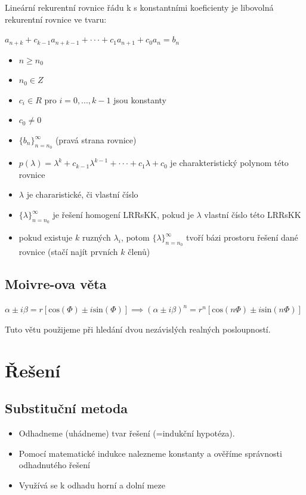 \documentclass{szzclass}
\begin{document}
Lineární rekurentní rovnice řádu k s konstantními koeficienty je
libovolná rekurentní rovnice ve tvaru:

\begin{center}
$a_{n+k} + c_{k−1}a_{n+k−1} + · · · + c_1a_{n+1} + c_0a_n = b_n$
\end{center}

\begin{itemize}
    \item $n \geq n_0$
    \item $n_0 \in Z$
    \item $c_i \in R$ pro $i = 0, . . . , k − 1$ jsou konstanty
    \item $c_0 \neq 0$
    \item $\{b_n\}^\infty_{n = n_0}$ (pravá strana rovnice)
    \item $p(\lambda) = \lambda^k + c_{k−1}\lambda^{k−1} + · · · + c_1\lambda + c_0$ je charakteristický polynom této rovnice
    \item $\lambda$ je chararistické, či vlastní číslo
    \item $\{\lambda\}^\infty_{n = n_0}$ je řešení homogení LRRsKK, pokud je $\lambda$ vlastní číslo této LRRsKK
    \item pokud existuje $k$ ruzných $\lambda_i$, potom $\{\lambda\}^\infty_{n = n_0}$ tvoří bázi prostoru řešení dané rovnice (stačí najít prvních $k$ členů)
\end{itemize}

\subsection{Moivre-ova věta}

$\alpha \pm i\beta = r[\text{cos}(\Phi) \pm i\text{sin}(\Phi)] \implies (\alpha \pm i\beta)^n = r^n[\text{cos}(n\Phi) \pm i\text{sin}(n\Phi)]$

Tuto větu použijeme při hledání dvou nezávislých realných posloupností.

\section{Řešení}

\subsection{Substituční metoda}

\begin{itemize}
    \item Odhadneme (uhádneme) tvar řešení (=indukční hypotéza).
    \item Pomocí matematické indukce nalezneme konstanty a ověříme
    správnosti odhadnutého řešení
    \item Využívá se k odhadu horní a dolní meze
\end{itemize}
\end{document}
